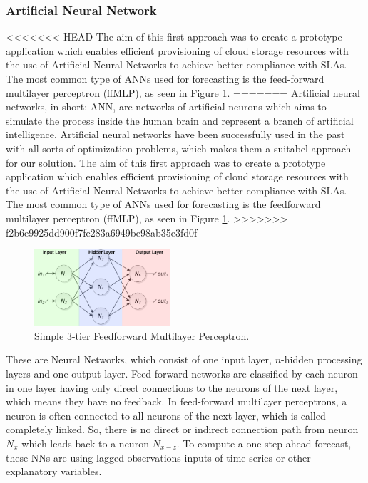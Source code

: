 \subsubsection{Artificial Neural Network}
<<<<<<< HEAD
The aim of this first approach  was to create a prototype application which enables efficient provisioning of cloud storage resources with the use of Artificial Neural Networks to achieve better compliance with SLAs. The most common type of ANNs used for forecasting is the feed-forward multilayer perceptron (ffMLP), as seen in Figure \ref{fig:Netz}. 
=======
Artificial neural networks, in short: ANN, are networks of artificial neurons which aims to simulate the process inside the human brain and represent a branch of artificial intelligence. Artificial neural networks have been successfully used in the past with all sorts of optimization problems, which makes them a suitabel approach for our solution. The aim of this first approach  was to create a prototype application which enables efficient provisioning of cloud storage resources with the use of Artificial Neural Networks to achieve better compliance with SLAs. The most common type of ANNs used for forecasting is the feedforward multilayer perceptron (ffMLP), as seen in Figure \ref{fig:Netz}. 
>>>>>>> f2b6e9925dd900f7fe283a6949be98ab35e3fd0f

\begin{figure}[ht]
	\begin{center}
		\includegraphics[width=0.45\textwidth]{fig/netz.png}
	\end{center}
	\caption{Simple 3-tier Feedforward Multilayer Perceptron.}
	\label{fig:Netz}
\end{figure}

These are Neural Networks, which consist of one input layer, $n$-hidden processing layers and one output layer. Feed-forward networks are classified by each neuron in one layer having only direct connections to the neurons of the next layer, which means they have no feedback. In feed-forward multilayer perceptrons, a neuron is often connected to all neurons of the next layer, which is called completely linked. So, there is no direct or indirect connection path from neuron $ N_{x} $ which leads back to a neuron $ N_{x-z} $. To compute a one-step-ahead forecast, these NNs are using lagged observations inputs of time series or other explanatory variables. 

